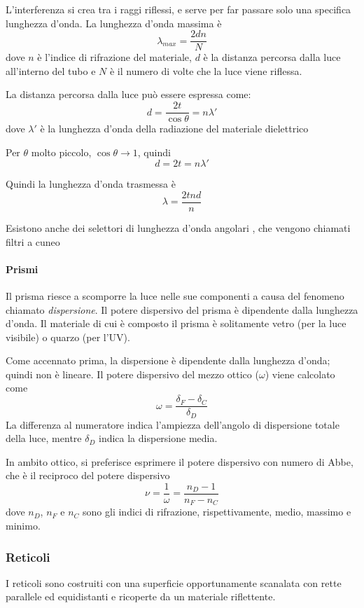 
L'interferenza si crea tra i raggi riflessi, e serve per far passare solo una specifica lunghezza d'onda.
La lunghezza d'onda massima è
\[
\lambda_{max} = \frac{2 d n}{N}
\]
dove $n$ è l'indice di rifrazione del materiale, $d$ è la distanza percorsa dalla luce all'interno del tubo e $N$ è il numero di volte che la luce viene riflessa.

La distanza percorsa dalla luce può essere espressa come:
\[
d = \frac{2t}{\cos \theta} = n \lambda'
\]
dove $\lambda'$ è la lunghezza d'onda della radiazione del materiale dielettrico

Per $\theta$ molto piccolo, $\cos \theta \to 1$, quindi
\[
d = 2t = n \lambda'
\]

Quindi la lunghezza d'onda trasmessa è
\[
\lambda = \frac{2 t n d}{n}
\]

Esistono anche dei selettori di lunghezza d'onda angolari , che vengono chiamati filtri a cuneo


\paragraph{Prismi}
Il prisma riesce a scomporre la luce nelle sue componenti a causa del fenomeno chiamato \emph{dispersione}.
Il potere dispersivo del prisma è dipendente dalla lunghezza d'onda.
Il materiale di cui è composto il prisma è solitamente vetro (per la luce visibile) o quarzo (per l'UV).

Come accennato prima, la dispersione è dipendente dalla lunghezza d'onda; quindi non è lineare.
Il potere dispersivo del mezzo ottico ($\omega$) viene calcolato come
\[
\omega = \frac{\delta_F - \delta_C}{\delta_D}
\]
La differenza al numeratore indica l'ampiezza dell'angolo di dispersione totale della luce, mentre $\delta_D$ indica la dispersione media.


In ambito ottico, si preferisce esprimere il potere dispersivo con numero di Abbe, che è il reciproco del potere dispersivo
\[
\nu = \frac{1}{\omega} = \frac{n_D - 1}{n_F - n_C}
\]
dove $n_D$, $n_F$ e $n_C$ sono gli indici di rifrazione, rispettivamente, medio, massimo e minimo.

\subsubsection{Reticoli}
I reticoli sono costruiti con una superficie opportunamente scanalata con rette parallele ed equidistanti e ricoperte da un materiale riflettente.

